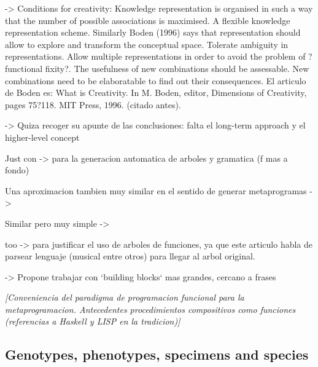\documentclass{article}
\begin{document}
{\color{red}


\cite{DBLP:journals/air/RoweP93} -> Conditions for creativity:
Knowledge representation is organised in such a
way that the number of possible associations is
maximised. A flexible knowledge representation
scheme. Similarly Boden (1996) says that representation
should allow to explore and transform the
conceptual space.
Tolerate ambiguity in representations.
Allow multiple representations in order to avoid the
problem of ?functional fixity?.
The usefulness of new combinations should be assessable.
New combinations need to be elaboratable to find
out their consequences.
El articulo de Boden es: 
What is Creativity. In M. Boden, editor, Dimensions of Creativity, pages 75?118. MIT Press, 1996. (citado antes).

\cite{Herremans:2017:FTM:3145473.3108242} -> Quiza recoger su apunte de las conclusiones: falta el long-term approach y el higher-level concept 




Just con \cite{Drewes_analgebra} -> para la generacion automatica de arboles y gramatica (f mas a fondo)

Una aproximacion tambien muy similar en el sentido de generar metaprogramas -> \cite{Spector_inductionand}

Similar pero muy simple -> \cite{Ando}

too \cite{Bod_thedata-oriented} -> para justificar el uso de arboles de funciones, ya que este articulo habla de parsear lenguaje (musical entre otros) para llegar al arbol original.

}



 
{\color{red}

\cite{DBLP:conf/icmc/Jacob95} -> Propone trabajar con `building blocks` mas grandes, cercano a frases
}


{\color{gray} \textsl{[Conveniencia del paradigma de programacion funcional para la metaprogramacion. Antecedentes procedimientos compositivos como funciones (referencias a Haskell y LISP en la tradicion)]}}





\subsection{Genotypes, phenotypes, specimens and species}
\end{document}
